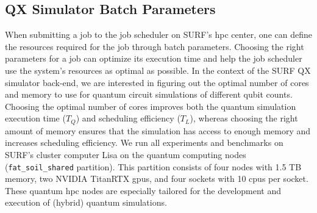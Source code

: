 \subsection{QX Simulator Batch Parameters} \label{sec:qx-parameters}
When submitting a job to the job scheduler on SURF's \gls{hpc} center, one can define the resources required for the job through batch parameters.
Choosing the right parameters for a job can optimize its execution time and help the job scheduler use the system's resources as optimal as possible.
In the context of the SURF QX simulator back-end, we are interested in figuring out the optimal number of cores and memory to use for quantum circuit simulations of different qubit counts.
Choosing the optimal number of cores improves both the quantum simulation execution time ($T_Q$) and scheduling efficiency ($T_L$), whereas choosing the right amount of memory ensures that the simulation has access to enough memory and increases scheduling efficiency.
We run all experiments and benchmarks on SURF's cluster computer Lisa on the quantum computing nodes (\texttt{fat_soil_shared} partition).
This partition consists of four nodes with 1.5 TB memory, two NVIDIA TitanRTX \glspl{gpu}, and four sockets with 10 \glspl{cpu} per socket.
These quantum \gls{hpc} nodes are especially tailored for the development and execution of (hybrid) quantum simulations.

